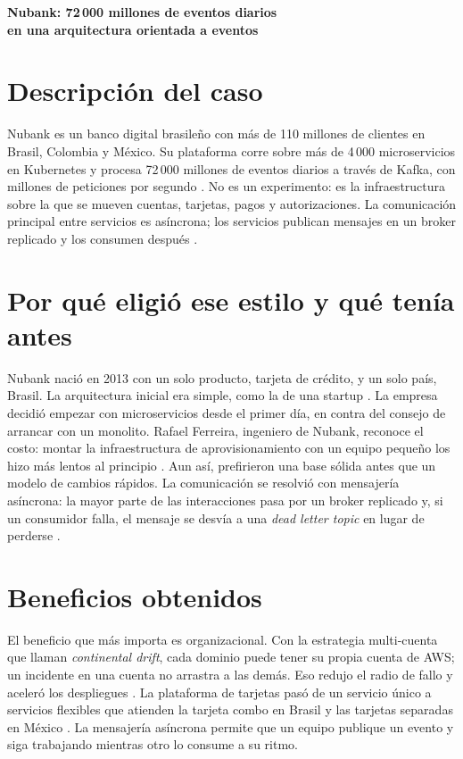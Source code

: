 \documentclass[11pt,a4paper]{article}
\begin{document}
\newpage
\begin{center}
{\Large\bfseries Nubank: 72\,000 millones de eventos diarios\\[0.1em]
en una arquitectura orientada a eventos\par}
\end{center}
\vspace{0.1cm}

\section{Descripción del caso}
Nubank es un banco digital brasileño con más de 110 millones de clientes en Brasil, Colombia y México. Su plataforma corre sobre más de 4\,000 microservicios en Kubernetes y procesa 72\,000 millones de eventos diarios a través de Kafka, con millones de peticiones por segundo \cite{nubank2025limits}. No es un experimento: es la infraestructura sobre la que se mueven cuentas, tarjetas, pagos y autorizaciones. La comunicación principal entre servicios es asíncrona; los servicios publican mensajes en un broker replicado y los consumen después \cite{nubank2019microservices}.

\section{Por qué eligió ese estilo y qué tenía antes}
Nubank nació en 2013 con un solo producto, tarjeta de crédito, y un solo país, Brasil. La arquitectura inicial era simple, como la de una startup \cite{nubank2025arch}. La empresa decidió empezar con microservicios desde el primer día, en contra del consejo de arrancar con un monolito. Rafael Ferreira, ingeniero de Nubank, reconoce el costo: montar la infraestructura de aprovisionamiento con un equipo pequeño los hizo más lentos al principio \cite{nubank2019microservices}. Aun así, prefirieron una base sólida antes que un modelo de cambios rápidos. La comunicación se resolvió con mensajería asíncrona: la mayor parte de las interacciones pasa por un broker replicado y, si un consumidor falla, el mensaje se desvía a una \emph{dead letter topic} en lugar de perderse \cite{nubank2019microservices}.

\section{Beneficios obtenidos}
El beneficio que más importa es organizacional. Con la estrategia multi-cuenta que llaman \emph{continental drift}, cada dominio puede tener su propia cuenta de AWS; un incidente en una cuenta no arrastra a las demás. Eso redujo el radio de fallo y aceleró los despliegues \cite{nubank2025limits}. La plataforma de tarjetas pasó de un servicio único a servicios flexibles que atienden la tarjeta combo en Brasil y las tarjetas separadas en México \cite{nubank2025arch}. La mensajería asíncrona permite que un equipo publique un evento y siga trabajando mientras otro lo consume a su ritmo.
\end{document}
